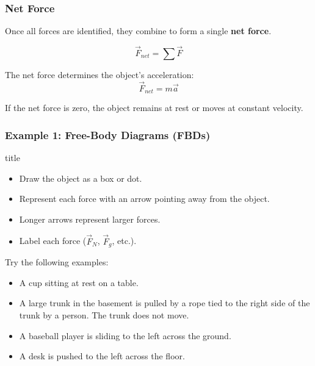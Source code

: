 \documentclass{beamer}
\begin{document}
\begin{frame}
\frametitle{Net Force}
Once all forces are identified, they combine to form a single \textbf{net force}.  

\[
\vec{F}_{net} = \sum \vec{F}
\]

The net force determines the object’s acceleration:
\[
\vec{F}_{net} = m\vec{a}
\]

If the net force is zero, the object remains at rest or moves at constant velocity.
\end{frame}

\begin{frame}
\frametitle{Example 1: Free-Body Diagrams (FBDs)}


\begin{beamercolorbox}[rounded=true, shadow=true, wd=\textwidth, sep=0.5em]{title}
\begin{itemize}
\item Draw the object as a box or dot.
\item Represent each force with an arrow pointing away from the object.
\item Longer arrows represent larger forces.
\item Label each force ($\vec{F}_N$, $\vec{F}_g$, etc.).
\end{itemize}
\end{beamercolorbox}

\vspace{0.8cm}
\noindent
Try the following examples: 
\begin{itemize}
    \item A cup sitting at rest on a table. 
    \item A large trunk in the basement is pulled by a rope tied to the right side of the trunk by a person. The trunk does not move. 
    \item A baseball player is sliding to the left across the ground. 
    \item A desk is pushed to the left across the floor. 
\end{itemize}
\end{frame}
\end{document}
